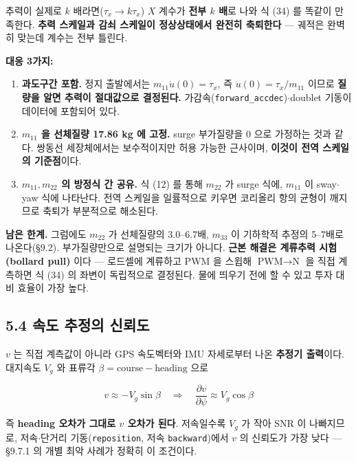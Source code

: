 \documentclass[10pt,a4paper]{article}
\begin{document}
추력이 실제로 $k$ 배라면($\tau_x \to k\tau_x$) $X$ 계수가 \textbf{전부 $k$ 배}로 나와 식 (34) 를 똑같이 만족한다. \textbf{추력 스케일과 감쇠 스케일이 정상상태에서 완전히 축퇴한다} --- 궤적은 완벽히 맞는데 계수는 전부 틀린다.

\textbf{대응 3가지:}

\begin{enumerate}[leftmargin=1.5em,itemsep=2pt,parsep=2pt,topsep=3pt]
\item \textbf{과도구간 포함.} 정지 출발에서는 $m_{11}\dot u(0) = \tau_x$, 즉 $\dot u(0) = \tau_x / m_{11}$ 이므로 \textbf{질량을 알면 추력이 절대값으로 결정된다.} 가감속(\texttt{forward\_accdec})$\cdot$doublet 기동이 데이터에 포함되어 있다.
\item \textbf{$m_{11}$ 을 선체질량 17.86 kg 에 고정.} surge 부가질량을 0 으로 가정하는 것과 같다. 쌍동선 세장체에서는 보수적이지만 허용 가능한 근사이며, \textbf{이것이 전역 스케일의 기준점}이다.
\item \textbf{$m_{11}, m_{22}$ 의 방정식 간 공유.} 식 (12) 를 통해 $m_{22}$ 가 surge 식에, $m_{11}$ 이 sway$\cdot$yaw 식에 나타난다. 전역 스케일을 일률적으로 키우면 코리올리 항의 균형이 깨지므로 축퇴가 부분적으로 해소된다.
\end{enumerate}

\textbf{남은 한계.} 그럼에도 $m_{22}$ 가 선체질량의 3.0--6.7배, $m_{33}$ 이 기하학적 추정의 5--7배로 나온다(\S{}9.2). 부가질량만으로 설명되는 크기가 아니다. \textbf{근본 해결은 계류추력 시험(bollard pull)} 이다 --- 로드셀에 계류하고 PWM 을 스윕해 $\text{PWM} \to \text{N}$ 을 직접 계측하면 식 (34) 의 좌변이 독립적으로 결정된다. 물에 띄우기 전에 할 수 있고 투자 대비 효율이 가장 높다.

\subsection*{5.4 속도 추정의 신뢰도}

$v$ 는 직접 계측값이 아니라 GPS 속도벡터와 IMU 자세로부터 나온 \textbf{추정기 출력}이다. 대지속도 $V_g$ 와 표류각 $\beta = \text{course} - \text{heading}$ 으로

\begin{equation*}
v \approx -V_g \sin\beta
\quad\Longrightarrow\quad
\frac{\partial v}{\partial \psi} \approx V_g \cos\beta \tag{35}
\end{equation*}

즉 \textbf{heading 오차가 그대로 $v$ 오차가 된다}. 저속일수록 $V_g$ 가 작아 SNR 이 나빠지므로, 저속$\cdot$단거리 기동(\texttt{reposition}, 저속 \texttt{backward})에서 $v$ 의 신뢰도가 가장 낮다 --- \S{}9.7.1 의 개별 최악 사례가 정확히 이 조건이다.
\end{document}
